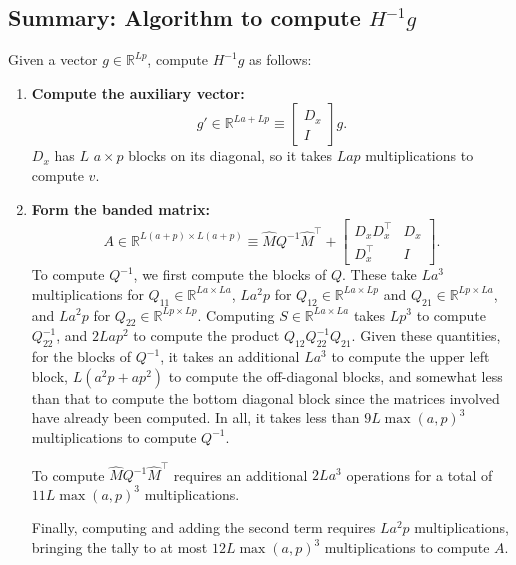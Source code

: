 \documentclass{article}
\begin{document}
\subsection*{Summary: Algorithm to compute $H^{-1} g$}

Given a vector $g \in \mathbb{R}^{Lp}$, compute $H^{-1} g$ as follows:

\begin{enumerate}
    \item
          \textbf{Compute the auxiliary vector:}
          \[
              g'  \in \mathbb{R}^{La + Lp} \equiv \begin{bmatrix}
                  D_x \\ I
              \end{bmatrix}
              g.
          \]
          $D_x$ has $L$ $a\times p$ blocks on its diagonal, so it takes $Lap$ multiplications to compute $v$.

    \item
          \textbf{Form the banded matrix:}
          \[
              A \in \mathbb{R}^{L(a+p) \times L(a+p)} \equiv \hat{M} Q^{-1} \hat{M}^\top +
              \begin{bmatrix}
                  D_x D_x^\top & D_x \\ D_x^\top & I
              \end{bmatrix}
              .
          \]
          To compute $Q^{-1}$, we first compute the blocks of $Q$. These take $La^3$
          multiplications for $Q_{11} \in \mathbb{R}^{La\times La}$, $La^2p$ for
          $Q_{12}\in \mathbb{R}^{L a\times Lp}$ and $Q_{21}\in \mathbb{R}^{Lp \times
                  La}$, and $La^2p$ for $Q_{22}\in \mathbb{R}^{Lp \times Lp}$. Computing $S\in
              \mathbb{R}^{La\times La}$ takes $L p^3$ to compute $Q_{22}^{-1}$, and $2Lap^2$
          to compute the product $Q_{12} Q_{22}^{-1} Q_{21}$. Given these quantities, for
          the blocks of $Q^{-1}$, it takes an additional $La^3$ to compute the upper left
          block, $L(a^2p+ap^2)$ to compute the off-diagonal blocks, and somewhat less
          than that to compute the bottom diagonal block since the matrices involved have
          already been computed. In all, it takes less than $9L\max(a,p)^3$
          multiplications to compute $Q^{-1}$.

          To compute $\hat{M}Q^{-1}\hat{M}^\top$ requires an additional $2La^3$
          operations for a total of $11L\max(a,p)^3$ multiplications.

          Finally, computing and adding the second term requires $La^2p$ multiplications,
          bringing the tally to at most $12 L \max(a,p)^3$ multiplications to compute
          $A$.


\end{enumerate}
\end{document}
